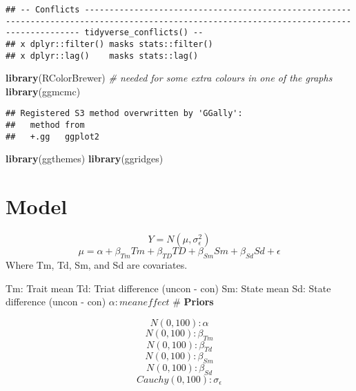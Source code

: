 \documentclass[
]{article}
\newenvironment{Shaded}{\begin{snugshade}}{\end{snugshade}}
\newcommand{\CommentTok}[1]{\textcolor[rgb]{0.56,0.35,0.01}{\textit{#1}}}
\newcommand{\KeywordTok}[1]{\textcolor[rgb]{0.13,0.29,0.53}{\textbf{#1}}}
\newcommand{\NormalTok}[1]{#1}
\begin{document}
\begin{verbatim}
## -- Conflicts ------------------------------------------------------------------------------------------------------------------------------------------- tidyverse_conflicts() --
## x dplyr::filter() masks stats::filter()
## x dplyr::lag()    masks stats::lag()
\end{verbatim}

\begin{Shaded}
\begin{Highlighting}[]
\KeywordTok{library}\NormalTok{(RColorBrewer) }\CommentTok{# needed for some extra colours in one of the graphs}
\KeywordTok{library}\NormalTok{(ggmcmc)}
\end{Highlighting}
\end{Shaded}

\begin{verbatim}
## Registered S3 method overwritten by 'GGally':
##   method from   
##   +.gg   ggplot2
\end{verbatim}

\begin{Shaded}
\begin{Highlighting}[]
\KeywordTok{library}\NormalTok{(ggthemes)}
\KeywordTok{library}\NormalTok{(ggridges)}
\end{Highlighting}
\end{Shaded}

\hypertarget{model-1}{%
\section{\texorpdfstring{\textbf{Model}}{Model}}\label{model-1}}

\[Y = N(\mu, \sigma_{\epsilon}^{2})\]
\[\mu = \alpha + \beta_{Tm}Tm + \beta_{TD}TD + \beta_{Sm}Sm+\beta_{Sd}Sd + \epsilon\]
Where Tm, Td, Sm, and Sd are covariates.

Tm: Trait mean Td: Triat difference (uncon - con) Sm: State mean Sd:
State difference (uncon - con) \(\alpha: mean effect\) \#
\textbf{Priors}

\[N(0,100): \alpha\] \[N(0,100): \beta_{Tm}\] \[N(0,100): \beta_{Td}\]
\[N(0,100): \beta_{Sm}\] \[N(0,100): \beta_{Sd}\]
\[Cauchy(0,100): \sigma_{\epsilon}\]
\end{document}
